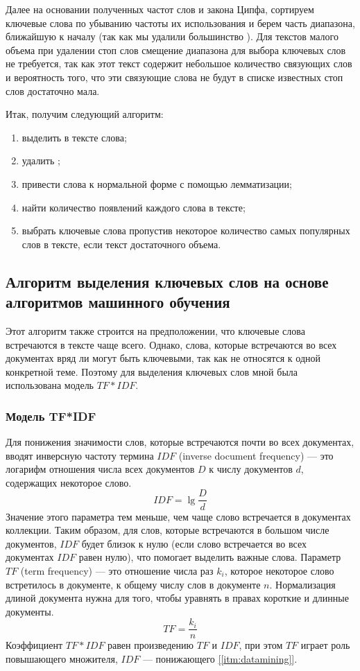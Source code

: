 Далее на основании полученных частот слов и закона Ципфа, сортируем ключевые слова по убыванию частоты их использования и берем часть диапазона, ближайшую к началу (так как мы удалили большинство ). Для текстов малого объема при удалении стоп слов смещение диапазона для выбора ключевых слов не требуется, так как этот текст содержит небольшое количество связующих слов и вероятность того, что эти связующие слова не будут в списке известных стоп слов достаточно мала.

Итак, получим следующий алгоритм:
\begin{enumerate}
\item выделить в тексте слова;
\item удалить ;
\item привести слова к нормальной форме с помощью лемматизации;
\item найти количество появлений каждого слова в тексте;
\item выбрать ключевые слова пропустив некоторое количество самых популярных слов в тексте, если текст достаточного объема.
\end{enumerate}

\subsection{Алгоритм выделения ключевых слов на основе алгоритмов машинного обучения}

Этот алгоритм также строится на предположении, что ключевые слова встречаются в тексте чаще всего. Однако, слова, которые встречаются во всех документах вряд ли могут быть ключевыми, так как не относятся к одной конкретной теме. Поэтому для выделения ключевых слов мной была использована модель $TF*IDF$.

\subsubsection{Модель TF*IDF}

Для понижения значимости слов, которые встречаются почти во всех документах, вводят инверсную частоту термина $IDF$
(inverse document frequency) — это логарифм отношения числа всех документов $D$ к числу документов $d$, содержащих некоторое слово.
\begin{equation}
\label{eq:idf}
IDF = \lg \dfrac{D}{d}
\end{equation}
Значение этого параметра тем меньше, чем чаще слово
встречается в документах коллекции. Таким образом, для слов, которые
встречаются в большом числе документов, $IDF$ будет близок к нулю (если
слово встречается во всех документах $IDF$ равен нулю), что помогает выделить важные слова.
Параметр $TF$ (term frequency) — это отношение числа раз $k_i$, которое
некоторое слово встретилось в документе, к общему числу слов в документе $n$. Нормализация длиной документа нужна для того, чтобы уравнять в правах короткие и длинные документы.
\begin{equation}
\label{eq:tf}
TF = \dfrac{k_i}{n}
\end{equation}
Коэффициент $TF*IDF$ равен произведению $TF$ и $IDF$, при этом $TF$ играет роль повышающего множителя, $IDF$ --- понижающего \hyperref[itm:datamining]{[\ref{itm:datamining}]}.

